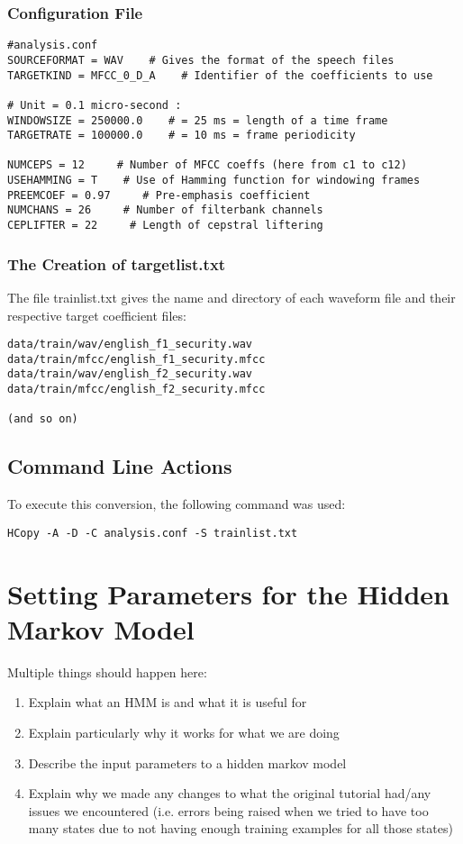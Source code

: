 \documentclass{wileySev}
\begin{document}
\subsection{Configuration File}
\begin{verbatim}
#analysis.conf
SOURCEFORMAT = WAV    # Gives the format of the speech files
TARGETKIND = MFCC_0_D_A    # Identifier of the coefficients to use

# Unit = 0.1 micro-second :
WINDOWSIZE = 250000.0    # = 25 ms = length of a time frame
TARGETRATE = 100000.0    # = 10 ms = frame periodicity

NUMCEPS = 12     # Number of MFCC coeffs (here from c1 to c12)
USEHAMMING = T    # Use of Hamming function for windowing frames
PREEMCOEF = 0.97     # Pre-emphasis coefficient
NUMCHANS = 26     # Number of filterbank channels
CEPLIFTER = 22     # Length of cepstral liftering
\end{verbatim}

\subsection{The Creation of targetlist.txt}

The file trainlist.txt gives the name and directory of each waveform file and their respective target coefficient files:
\begin{verbatim}
data/train/wav/english_f1_security.wav data/train/mfcc/english_f1_security.mfcc
data/train/wav/english_f2_security.wav data/train/mfcc/english_f2_security.mfcc

(and so on)
\end{verbatim}

\section{Command Line Actions}
To execute this conversion, the following command was used:
\begin{verbatim}
HCopy -A -D -C analysis.conf -S trainlist.txt
\end{verbatim}

\chapter{Setting Parameters for the Hidden Markov Model}
Multiple things should happen here:
\begin{enumerate}
\item Explain what an HMM is and what it is useful for
\item Explain particularly why it works for what we are doing
\item Describe the input parameters to a hidden markov model
\item Explain why we made any changes to what the original tutorial had/any issues we encountered (i.e. errors being raised when we tried to have too many states due to not having enough training examples for all those states)
\end{enumerate}
\end{document}
